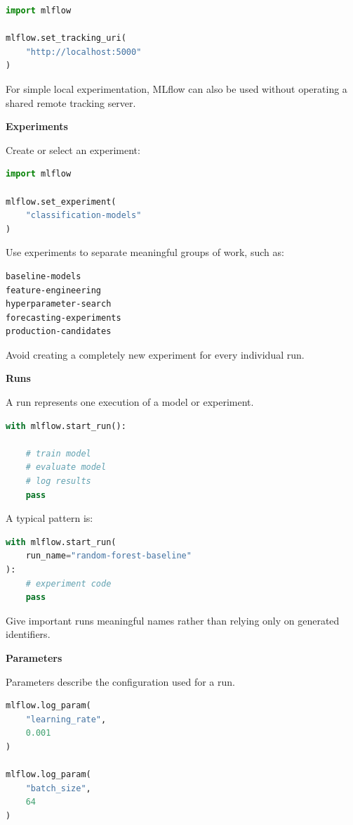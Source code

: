 \documentclass[11pt,letterpaper]{article}
\begin{document}
\begin{lstlisting}[language=Python]
import mlflow

mlflow.set_tracking_uri(
    "http://localhost:5000"
)
\end{lstlisting}

For simple local experimentation, MLflow can also be used without operating a
shared remote tracking server.

\textbf{Experiments}

Create or select an experiment:

\begin{lstlisting}[language=Python]
import mlflow

mlflow.set_experiment(
    "classification-models"
)
\end{lstlisting}

Use experiments to separate meaningful groups of work, such as:

\begin{lstlisting}
baseline-models
feature-engineering
hyperparameter-search
forecasting-experiments
production-candidates
\end{lstlisting}

Avoid creating a completely new experiment for every individual run.

\textbf{Runs}

A run represents one execution of a model or experiment.

\begin{lstlisting}[language=Python]
with mlflow.start_run():

    # train model
    # evaluate model
    # log results
    pass
\end{lstlisting}

A typical pattern is:

\begin{lstlisting}[language=Python]
with mlflow.start_run(
    run_name="random-forest-baseline"
):
    # experiment code
    pass
\end{lstlisting}

Give important runs meaningful names rather than relying only on generated
identifiers.

\textbf{Parameters}

Parameters describe the configuration used for a run.

\begin{lstlisting}[language=Python]
mlflow.log_param(
    "learning_rate",
    0.001
)

mlflow.log_param(
    "batch_size",
    64
)
\end{lstlisting}
\end{document}
